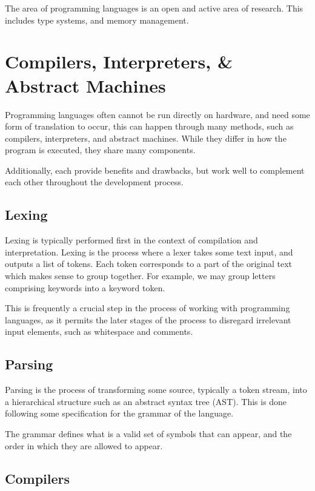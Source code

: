 The area of programming languages is an open and active area of research. This includes type systems, and memory management\cite{Regions}.

\section{Compilers, Interpreters, \& Abstract Machines}

Programming languages often cannot be run directly on hardware, and need some form of translation to occur, this can happen through many methods, such as compilers, interpreters, and abstract machines.
While they differ in how the program is executed, they share many components.

Additionally, each provide benefits and drawbacks, but work well to complement each other throughout the development process.

\subsection{Lexing}

Lexing is typically performed first in the context of compilation and interpretation\cite{CompilerConstruction, DragonBook}. Lexing is the process where a lexer takes some text input, and outputs a list of tokens. Each token corresponds to a part of the original text which makes sense to group together. For example, we may group letters comprising keywords into a keyword token. 

This is frequently a crucial step in the process of working with programming languages, as it permits the later stages of the process to disregard irrelevant input elements, such as whitespace and comments.

\subsection{Parsing}

Parsing is the process of transforming some source, typically a token stream, into a hierarchical structure such as an abstract syntax tree (AST)\cite{CompilerConstruction, DragonBook}. This is done following some specification for the grammar of the language.

The grammar defines what is a valid set of symbols that can appear, and the order in which they are allowed to appear.

\subsection{Compilers}

